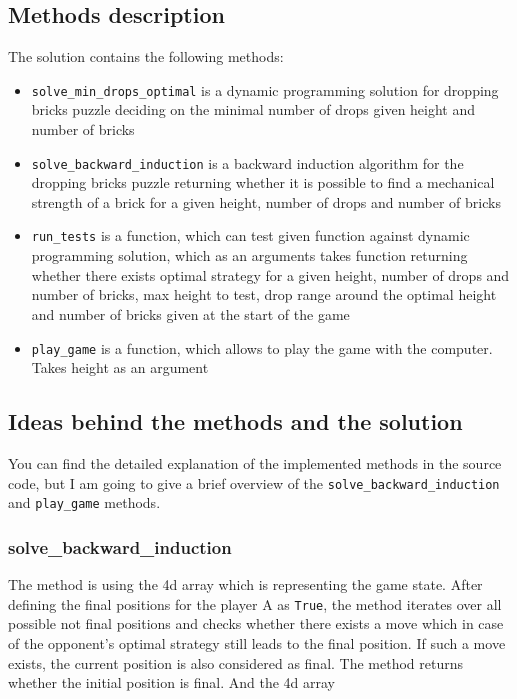 \documentclass{article}
\begin{document}
\subsection{Methods description}
The solution contains the following methods:
\begin{itemize}
    \item \verb|solve_min_drops_optimal| is a dynamic programming solution for dropping bricks puzzle deciding on the minimal number of drops given height and number of bricks
    \item \verb|solve_backward_induction| is a backward induction algorithm for the dropping bricks puzzle returning whether it is possible to find a mechanical strength of a brick for a given height, number of drops and number of bricks
    \item \verb|run_tests| is a function, which can test given function against dynamic programming solution, which as an arguments takes function returning whether there exists optimal strategy for a given height, number of drops and number of bricks, max height to test, drop range around the optimal height and number of bricks given at the start of the game
    \item \verb|play_game| is a function, which allows to play the game with the computer. Takes height as an argument
\end{itemize}

\subsection{Ideas behind the methods and the solution}
You can find the detailed explanation of the implemented methods in the source
code, but I am going to give a brief overview of the
\verb|solve_backward_induction| and \verb|play_game| methods.

\subsubsection{solve\_backward\_induction}
The method is using the 4d array which is representing the game state. After
defining the final positions for the player A as \verb|True|, the method
iterates over all possible not final positions and checks whether there exists
a move which in case of the opponent's optimal strategy still leads to the
final position. If such a move exists, the current position is also considered
as final. The method returns whether the initial position is final. And the 4d
array
\end{document}
